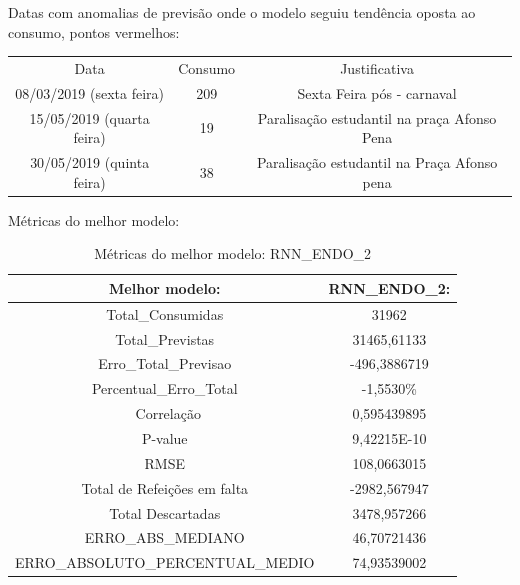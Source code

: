 \documentclass[	12pt, Times, openright, twoside, a4paper, english, brazil]{abntex2}
\begin{document}
            Datas com anomalias de previsão onde o modelo seguiu tendência oposta ao consumo, pontos vermelhos:
            \begin{table}[!ht]
                 \begin{tabular}{|c|c|c|}
                 \rowcolor{gray!50}
                 \hline
            Data & Consumo & Justificativa \\
            08/03/2019 (sexta feira)   & 209 &Sexta Feira pós - carnaval\\
           15/05/2019 (quarta feira)   & 19  & Paralisação estudantil na praça Afonso Pena\\
            30/05/2019 (quinta feira)   &  38  & Paralisação estudantil na Praça Afonso pena\\
            \hline \end{tabular} \end{table}

            Métricas do melhor modelo: 
            \begin{table}[!ht]
            \centering
            \begin{tabular}{|c|c|}
            \rowcolor{gray!50}
            \hline
                Melhor modelo: &   RNN\_ENDO\_2: \\ \hline
                Total\_Consumidas & 31962 \\ 
                Total\_Previstas & 31465,61133 \\
                Erro\_Total\_Previsao & -496,3886719 \\
                Percentual\_Erro\_Total & -1,5530\% \\\
                Correlação & 0,595439895 \\
                P-value & 9,42215E-10    \\
                RMSE &  108,0663015\\
                Total de Refeições em falta & -2982,567947 \\Total Descartadas & 3478,957266\\
                ERRO\_ABS\_MEDIANO & 46,70721436 
                \\ ERRO\_ABSOLUTO\_PERCENTUAL\_MEDIO & 74,93539002 \\ 
            \hline 
            \end{tabular}
            \caption{Métricas do melhor modelo:  RNN\_ENDO\_2 }
            \label{table:rnn_endo_2_test}
            \end{table}
            
\end{document}
